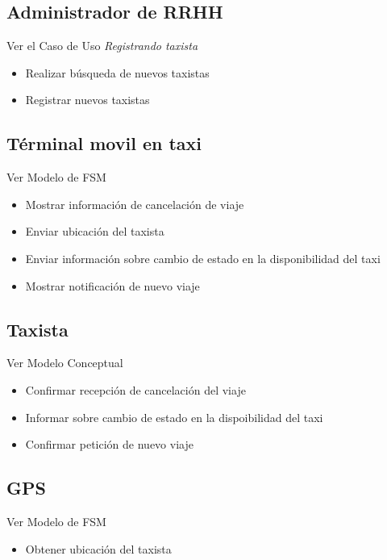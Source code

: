 \documentclass[a4paper]{article}
\begin{document}
\subsection{Administrador de RRHH}
Ver el Caso de Uso \textit{Registrando taxista}
\begin{itemize}
 \item Realizar b\'usqueda de nuevos taxistas
 \item Registrar nuevos taxistas
\end{itemize}


\subsection{T\'erminal movil en taxi}
Ver Modelo de FSM
\begin{itemize}
 \item Mostrar informaci\'on de cancelaci\'on de viaje
 \item Enviar ubicaci\'on del taxista
 \item Enviar informaci\'on sobre cambio de estado en la disponibilidad del taxi
 \item Mostrar notificaci\'on de nuevo viaje

 \end{itemize}

\subsection{Taxista}
Ver Modelo Conceptual
\begin{itemize}
 \item Confirmar recepci\'on de cancelaci\'on del viaje
 \item Informar sobre cambio de estado en la dispoibilidad del taxi
 \item Confirmar petici\'on de nuevo viaje
\end{itemize}

\subsection{GPS}
Ver Modelo de FSM
\begin{itemize}
 \item Obtener ubicaci\'on del taxista
\end{itemize}
\end{document}
